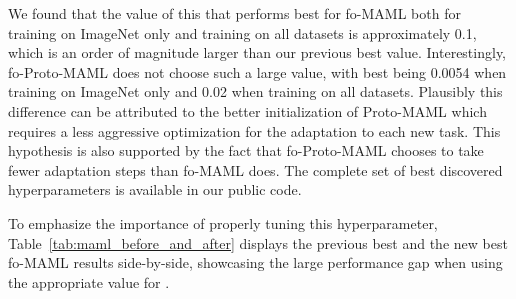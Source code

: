 \documentclass{article} \usepackage{iclr2020_conference,times}
\begin{document}
We found that the value of this  that performs best for fo-MAML both
for training on ImageNet only and training on all datasets is approximately
0.1, which is an order of magnitude larger than our previous best value.
Interestingly, fo-Proto-MAML does not choose such a large  value, with
best  being 0.0054 when training on ImageNet only and 0.02 when
training on all datasets. Plausibly this difference can be attributed to the
better initialization of Proto-MAML which requires a less aggressive
optimization for the adaptation to each new task. This hypothesis is also
supported by the fact that fo-Proto-MAML chooses to take fewer adaptation steps
than fo-MAML does. The complete set of best discovered hyperparameters is
available in our public code.

To emphasize the importance of properly tuning this hyperparameter,
Table~\ref{tab:maml_before_and_after} displays the previous best and the new
best fo-MAML results side-by-side, showcasing the large performance gap when
using the appropriate value for .
\end{document}
